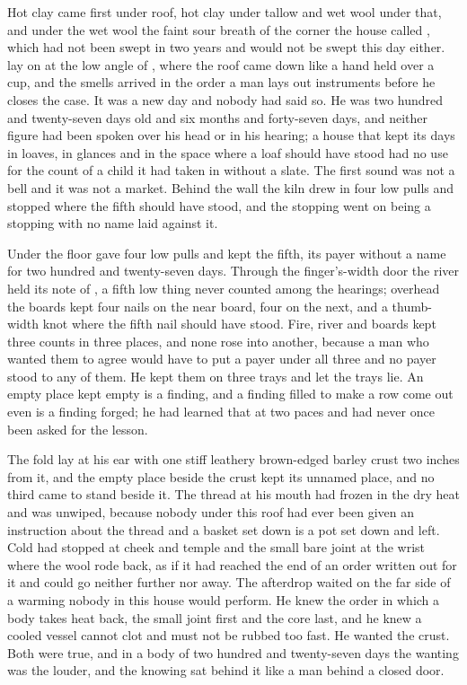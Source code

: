 
Hot clay came first under  roof, hot clay under tallow and wet wool under that, and under the wet wool the faint sour breath of the corner the house called , which had not been swept in two years and would not be swept this day either.  lay on  at the low angle of , where the roof came down like a hand held over a cup, and the smells arrived in the order a man lays out instruments before he closes the case. It was a new day and nobody had said so. He was two hundred and twenty-seven days old and six months and forty-seven days, and neither figure had been spoken over his head or in his hearing; a house that kept its days in loaves, in glances and in the space where a loaf should have stood had no use for the count of a child it had taken in without a slate. The first sound was not a bell and it was not a market. Behind the wall the kiln drew in four low pulls and stopped where the fifth should have stood, and the stopping went on being a stopping with no name laid against it.

Under the floor  gave four low pulls and kept the fifth, its payer without a name for two hundred and twenty-seven days. Through the finger's-width door the river held its note of , a fifth low thing never counted among the hearings; overhead the boards kept four nails on the near board, four on the next, and a thumb-width knot where the fifth nail should have stood. Fire, river and boards kept three counts in three places, and none rose into another, because a man who wanted them to agree would have to put a payer under all three and no payer stood to any of them. He kept them on three trays and let the trays lie. An empty place kept empty is a finding, and a finding filled to make a row come out even is a finding forged; he had learned that at two paces and had never once been asked for the lesson.

The fold lay at his ear with one stiff leathery brown-edged barley crust two inches from it, and the empty place beside the crust kept its unnamed place, and no third came to stand beside it. The thread at his mouth had frozen in the dry heat and was unwiped, because nobody under this roof had ever been given an instruction about the thread and a basket set down is a pot set down and left. Cold had stopped at cheek and temple and the small bare joint at the wrist where the wool rode back, as if it had reached the end of an order written out for it and could go neither further nor away. The afterdrop waited on the far side of a warming nobody in this house would perform. He knew the order in which a body takes heat back, the small joint first and the core last, and he knew a cooled vessel cannot clot and must not be rubbed too fast. He wanted the crust. Both were true, and in a body of two hundred and twenty-seven days the wanting was the louder, and the knowing sat behind it like a man behind a closed door.

